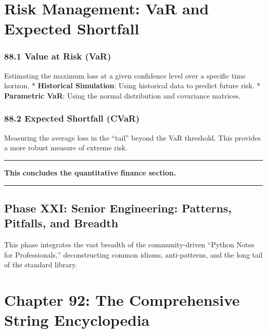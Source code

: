 \hypertarget{risk-management-var-and-expected-shortfall}{%
\chapter{Risk Management: VaR and Expected
Shortfall}\label{risk-management-var-and-expected-shortfall}}

\hypertarget{value-at-risk-var}{%
\subsection{88.1 Value at Risk (VaR)}\label{value-at-risk-var}}

Estimating the maximum loss at a given confidence level over a specific
time horizon. * \textbf{Historical Simulation}: Using historical data to
predict future risk. * \textbf{Parametric VaR}: Using the normal
distribution and covariance matrices.

\hypertarget{expected-shortfall-cvar}{%
\subsection{88.2 Expected Shortfall
(CVaR)}\label{expected-shortfall-cvar}}

Measuring the average loss in the ``tail'' beyond the VaR threshold.
This provides a more robust measure of extreme risk.

\begin{center}\rule{0.5\linewidth}{0.5pt}\end{center}

\textbf{This concludes the quantitative finance section.}

\begin{center}\rule{0.5\linewidth}{0.5pt}\end{center}

\hypertarget{phase-xxi-senior-engineering-patterns-pitfalls-and-breadth}{%
\section{Phase XXI: Senior Engineering: Patterns, Pitfalls, and
Breadth}\label{phase-xxi-senior-engineering-patterns-pitfalls-and-breadth}}

This phase integrates the vast breadth of the community-driven ``Python
Notes for Professionals,'' deconstructing common idioms, anti-patterns,
and the long tail of the standard library.

\hypertarget{chapter-92-the-comprehensive-string-encyclopedia}{%
\chapter{Chapter 92: The Comprehensive String
Encyclopedia}\label{chapter-92-the-comprehensive-string-encyclopedia}}

